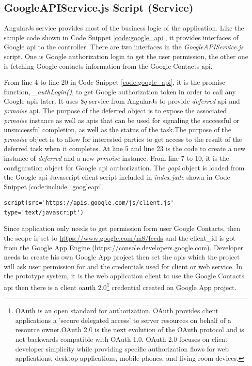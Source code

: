 \subsection{GoogleAPIService.js Script (Service)}

\par AngularJs service provides most of the business logic of the application. Like the sample code shown in Code Snippet \ref{code:google_api}, it provides interfaces of Google \gls{api} to the controller. There are two interfaces in the \textit{GoogleAPIService.js} script. One is Google authorization login to get the user permission, the other one is fetching Google contacts information from the Google Contacts \gls{api}.

\par From line 4 to line 20 in Code Snippet \ref{code:google_api}, it is the promise function, \textit{\_authLogin()}, to get Google authorization token in order to call any Google \gls{api}s later. It uses \textit{\$q} service from AngularJs to provide \textit{deferred} \gls{api} and \textit{prmoise} \gls{api}. The purpose of the deferred object is to expose the associated \textit{prmoise} instance as well as \gls{api}s that can be used for signaling the successful or unsuccessful completion, as well as the status of the task.The purpose of the \textit{prmoise} object is to allow for interested parties to get access to the result of the deferred task when it completes.\cite{angular:q} At line 5 and line 23 is the code to create a new instance of \textit{deferred} and a new \textit{prmoise} instance. From line 7 to 10, it is the configuration object for Google \gls{api} authorization. The \textit{gapi} object is loaded from the Google \gls{api} Javascript client script included in \textit{index.jade} shown in Code Snippet \ref{code:include_googleapi}.

\begin{lstlisting}[caption={Include Google API Javascript file in Index.iade},label={code:include_googleapi}]
script(src='https://apis.google.com/js/client.js' type='text/javascript')
\end{lstlisting}

\par Since application only needs to get permission form user Google Contacts, then the scope is set to \url{https://www.google.com/m8/feeds} and the client\_id is got from the Google App Engine (\url{https://console.developers.google.com}). Developer needs to create his own Google App project then set the \gls{api}s which the project will ask user permission for and the credentials used for client or web service. In the prototype system, it is the web application client to use the Google Contacts \gls{api} then there is a client \gls{oauth} 2.0\footnote{OAuth is an open standard for authorization. OAuth provides client applications a 'secure delegated access' to server resources on behalf of a resource owner.OAuth 2.0 is the next evolution of the OAuth protocol and is not backwards compatible with OAuth 1.0. OAuth 2.0 focuses on client developer simplicity while providing specific authorization flows for web applications, desktop applications, mobile phones, and living room devices.\cite{wiki:oauth}} credential created on Google App project.

